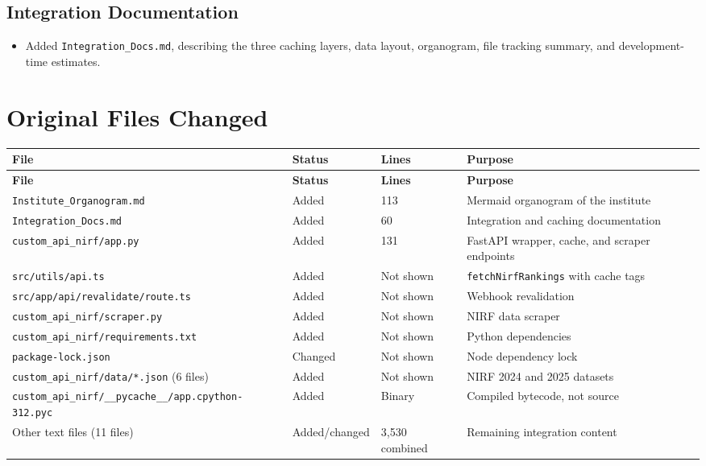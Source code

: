 \documentclass[11pt,a4paper]{article}
\begin{document}
\subsection*{Integration Documentation}
\begin{itemize}[leftmargin=1.4em,itemsep=2pt]
  \item Added \texttt{Integration\_Docs.md}, describing the three caching layers, data layout, organogram, file tracking summary, and development-time estimates.
\end{itemize}

\section*{Original Files Changed}
\small
\begin{longtable}{p{5.2cm}p{1.5cm}p{2cm}p{4.5cm}}
\toprule
\textbf{File} & \textbf{Status} & \textbf{Lines} & \textbf{Purpose} \\
\midrule
\endfirsthead
\toprule
\textbf{File} & \textbf{Status} & \textbf{Lines} & \textbf{Purpose} \\
\midrule
\endhead
\texttt{Institute\_Organogram.md} & Added & 113 & Mermaid organogram of the institute \\
\texttt{Integration\_Docs.md} & Added & 60 & Integration and caching documentation \\
\texttt{custom\_api\_nirf/app.py} & Added & 131 & FastAPI wrapper, cache, and scraper endpoints \\
\texttt{src/utils/api.ts} & Added & Not shown & \texttt{fetchNirfRankings} with cache tags \\
\texttt{src/app/api/revalidate/route.ts} & Added & Not shown & Webhook revalidation \\
\texttt{custom\_api\_nirf/scraper.py} & Added & Not shown & NIRF data scraper \\
\texttt{custom\_api\_nirf/requirements.txt} & Added & Not shown & Python dependencies \\
\texttt{package-lock.json} & Changed & Not shown & Node dependency lock \\
\texttt{custom\_api\_nirf/data/*.json} (6 files) & Added & Not shown & NIRF 2024 and 2025 datasets \\
\texttt{custom\_api\_nirf/\_\_pycache\_\_/app.cpython-312.pyc} & Added & Binary & Compiled bytecode, not source \\
Other text files (11 files) & Added/changed & 3,530 combined & Remaining integration content \\
\bottomrule
\end{longtable}
\normalsize
\end{document}
